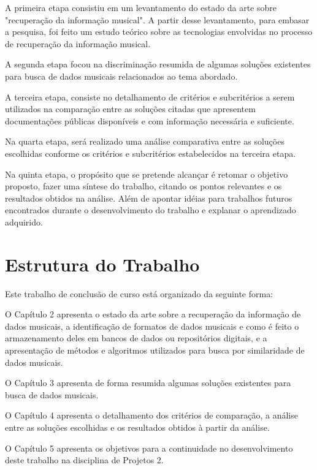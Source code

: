 A primeira etapa consistiu em um levantamento do estado da arte sobre "recuperação da informação musical". A partir desse levantamento, para embasar a pesquisa, foi feito um estudo teórico sobre as tecnologias envolvidas no processo de recuperação da informação musical.

A segunda etapa focou na discriminação resumida de algumas soluções existentes para busca de dados musicais relacionados ao tema abordado.

A terceira etapa, consiste no detalhamento de critérios e subcritérios a serem utilizados na comparação entre as soluções citadas que apresentem documentações públicas disponíveis e com informação necessária e suficiente.

Na quarta etapa, será realizado uma análise comparativa entre as soluções escolhidas conforme os critérios e subcritérios estabelecidos na terceira etapa.

Na quinta etapa, o propósito que se pretende alcançar é retomar o objetivo proposto, fazer uma síntese do trabalho, citando os pontos relevantes e os resultados obtidos na análise. Além de apontar idéias para trabalhos futuros encontrados durante o desenvolvimento do trabalho e explanar o aprendizado adquirido.

\section{Estrutura do Trabalho}
Este trabalho de conclusão de curso está organizado da seguinte forma: 

O Capítulo 2 apresenta o estado da arte sobre a recuperação da informação de dados musicais, a identificação de formatos de dados musicais e como é feito o armazenamento deles em bancos de dados ou repositórios digitais, e a apresentação de métodos e algoritmos utilizados para busca por similaridade de dados musicais.

O Capítulo 3 apresenta de forma resumida algumas soluções existentes para busca de dados musicais.

O Capítulo 4 apresenta o detalhamento dos critérios de comparação, a análise entre as soluções escolhidas e os resultados obtidos à partir da análise.

O Capítulo 5 apresenta os objetivos para a continuidade no desenvolvimento deste trabalho na disciplina de Projetos 2.